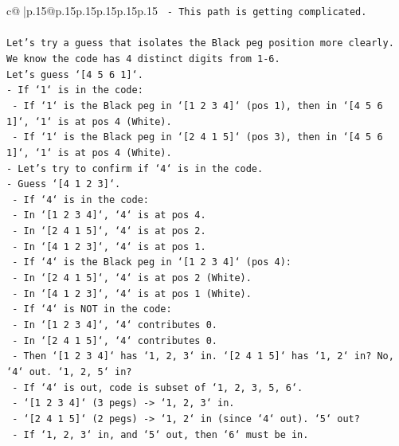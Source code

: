 \documentclass{article}
\begin{document}
{\begin{supertabular}{c@{$\;$}|p{.15\linewidth}@{}p{.15\linewidth}p{.15\linewidth}p{.15\linewidth}p{.15\linewidth}p{.15\linewidth}}
{{{\texttt{                {-} This path is getting complicated.} \\
\\ 
\texttt{Let's try a guess that isolates the Black peg position more clearly.} \\
\texttt{We know the code has 4 distinct digits from 1{-}6.} \\
\texttt{Let's guess `{[}4 5 6 1{]}`.} \\
\texttt{{-} If `1` is in the code:} \\
\texttt{    {-} If `1` is the Black peg in `{[}1 2 3 4{]}` (pos 1), then in `{[}4 5 6 1{]}`, `1` is at pos 4 (White).} \\
\texttt{    {-} If `1` is the Black peg in `{[}2 4 1 5{]}` (pos 3), then in `{[}4 5 6 1{]}`, `1` is at pos 4 (White).} \\
\texttt{{-} Let's try to confirm if `4` is in the code.} \\
\texttt{{-} Guess `{[}4 1 2 3{]}`.} \\
\texttt{    {-} If `4` is in the code:} \\
\texttt{        {-} In `{[}1 2 3 4{]}`, `4` is at pos 4.} \\
\texttt{        {-} In `{[}2 4 1 5{]}`, `4` is at pos 2.} \\
\texttt{        {-} In `{[}4 1 2 3{]}`, `4` is at pos 1.} \\
\texttt{    {-} If `4` is the Black peg in `{[}1 2 3 4{]}` (pos 4):} \\
\texttt{        {-} In `{[}2 4 1 5{]}`, `4` is at pos 2 (White).} \\
\texttt{        {-} In `{[}4 1 2 3{]}`, `4` is at pos 1 (White).} \\
\texttt{    {-} If `4` is NOT in the code:} \\
\texttt{        {-} In `{[}1 2 3 4{]}`, `4` contributes 0.} \\
\texttt{        {-} In `{[}2 4 1 5{]}`, `4` contributes 0.} \\
\texttt{        {-} Then `{[}1 2 3 4{]}` has `1, 2, 3` in. `{[}2 4 1 5{]}` has `1, 2` in? No, `4` out. `1, 2, 5` in?} \\
\texttt{        {-} If `4` is out, code is subset of `1, 2, 3, 5, 6`.} \\
\texttt{        {-} `{[}1 2 3 4{]}` (3 pegs) {-}> `1, 2, 3` in.} \\
\texttt{        {-} `{[}2 4 1 5{]}` (2 pegs) {-}> `1, 2` in (since `4` out). `5` out?} \\
\texttt{        {-} If `1, 2, 3` in, and `5` out, then `6` must be in.} \\
}}}
\end{supertabular}}
\end{document}
